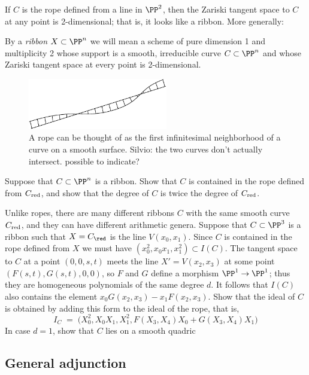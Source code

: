 If $C$ is the rope defined from a line in $\PP^2$, then the Zariski tangent space to $C$ at
any point is 2-dimensional; that is, it looks like a ribbon. More generally:

\begin{definition}
By a \emph{ribbon} $X \subset \PP^n$ we will mean a scheme of pure dimension 1 and multiplicity 2 whose support is a smooth, irreducible curve $C \subset \PP^n$ and whose Zariski tangent space at every point is 2-dimensional.
\end{definition}


\begin{figure}
\centerline {\includegraphics[width=2.4in]{"main/Fig15-3"}}
\caption{A rope can be thought of as the first infinitesimal neighborhood
of a curve on a smooth surface. {Silvio: the two curves don't actually intersect. possible to indicate?}}
\label{Fig15.3}
\end{figure}

\begin{exercise}
Suppose that $C\subset \PP^n$ is a ribbon. Show that $C$ is contained in the rope defined
from $C_{\rm red}$, and show that the degree of $C$ is twice the degree of $C_{\rm red}$.
\end{exercise}

Unlike ropes, there are many different ribbons $C$ with the same smooth curve $C_{\rm red}$,
and they can have different arithmetic genera. 
Suppose that $C\subset \PP^3$ is a ribbon such that $X = C_{\red}$ is the line $V(x_0,x_1)$.
Since $C$ is contained in the rope defined from $X$ we must have $(x_0^2, x_0x_1,x_1^2) \subset I(C)$. The tangent space to $C$ at a point $(0,0,s,t)$ meets the line  $X' = V(x_2, x_3)$
at some point $(F(s,t),G(s,t),0,0)$, so $F$ and $G$ define a morphism $\PP^1 \to \PP^1$;
thus they are homogeneous polynomials of the same degree $d$.  It follows that $I(C)$ also contains the element
$x_0 G(x_2, x_3) - x_1F(x_2,x_3)$. Show that the ideal of $C$ is obtained by adding this form to the ideal of the rope, that is,
$$
I_C \; = \; \big(X_0^2, X_0X_1, X_1^2, F(X_3,X_4)X_0 + G(X_3,X_4)X_1\big)
$$
In case $d=1$, show that $C$ lies on a smooth quadric 
\subsection{General adjunction}

